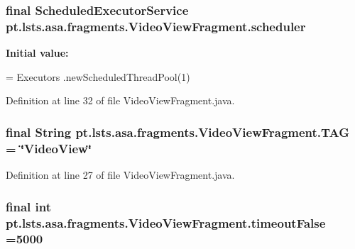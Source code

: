 \subsubsection[{scheduler}]{\setlength{\rightskip}{0pt plus 5cm}final Scheduled\+Executor\+Service pt.\+lsts.\+asa.\+fragments.\+Video\+View\+Fragment.\+scheduler\hspace{0.3cm}{\ttfamily [private]}}\label{classpt_1_1lsts_1_1asa_1_1fragments_1_1VideoViewFragment_a4d2b6fb27e4dc4d86576cba1158f1b8a}
{\bfseries Initial value\+:}
\begin{DoxyCode}
= Executors
            .newScheduledThreadPool(1)
\end{DoxyCode}


Definition at line 32 of file Video\+View\+Fragment.\+java.

\hypertarget{classpt_1_1lsts_1_1asa_1_1fragments_1_1VideoViewFragment_aba4ef1bec9e8ed8234b57753c016a124}{}
\subsubsection[{T\+A\+G}]{\setlength{\rightskip}{0pt plus 5cm}final String pt.\+lsts.\+asa.\+fragments.\+Video\+View\+Fragment.\+T\+A\+G = \char`\"{}Video\+View\char`\"{}\hspace{0.3cm}{\ttfamily [private]}}\label{classpt_1_1lsts_1_1asa_1_1fragments_1_1VideoViewFragment_aba4ef1bec9e8ed8234b57753c016a124}


Definition at line 27 of file Video\+View\+Fragment.\+java.

\hypertarget{classpt_1_1lsts_1_1asa_1_1fragments_1_1VideoViewFragment_ad90f5f78e9fb42d5b0d4c64ccc94b8f5}{}
\subsubsection[{timeout\+False}]{\setlength{\rightskip}{0pt plus 5cm}final int pt.\+lsts.\+asa.\+fragments.\+Video\+View\+Fragment.\+timeout\+False =5000\hspace{0.3cm}{\ttfamily [private]}}\label{classpt_1_1lsts_1_1asa_1_1fragments_1_1VideoViewFragment_ad90f5f78e9fb42d5b0d4c64ccc94b8f5}


